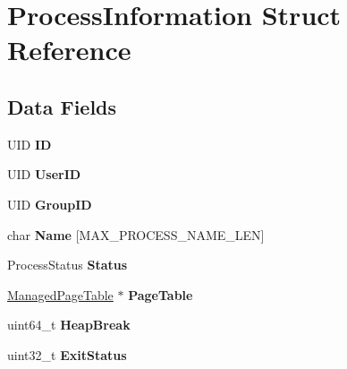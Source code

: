 \hypertarget{structProcessInformation}{}\section{Process\+Information Struct Reference}
\label{structProcessInformation}
\subsection*{Data Fields}
\begin{DoxyCompactItemize}
\item 
U\+ID {\bfseries ID}\hypertarget{structProcessInformation_a511ba3ee8ee6fb0e118805e75c054039}{}\label{structProcessInformation_a511ba3ee8ee6fb0e118805e75c054039}

\item 
U\+ID {\bfseries User\+ID}\hypertarget{structProcessInformation_aac4bbe9db1aabec6224f48a625efacb5}{}\label{structProcessInformation_aac4bbe9db1aabec6224f48a625efacb5}

\item 
U\+ID {\bfseries Group\+ID}\hypertarget{structProcessInformation_a3a34d1bc21f65a73b1a7b6852ba1044b}{}\label{structProcessInformation_a3a34d1bc21f65a73b1a7b6852ba1044b}

\item 
char {\bfseries Name} \mbox{[}M\+A\+X\+\_\+\+P\+R\+O\+C\+E\+S\+S\+\_\+\+N\+A\+M\+E\+\_\+\+L\+EN\mbox{]}\hypertarget{structProcessInformation_a912bea277ead35d49596c85b41741364}{}\label{structProcessInformation_a912bea277ead35d49596c85b41741364}

\item 
Process\+Status {\bfseries Status}\hypertarget{structProcessInformation_a9a59f80490c08ec417e82e6e4bd057f0}{}\label{structProcessInformation_a9a59f80490c08ec417e82e6e4bd057f0}

\item 
\hyperlink{structManagedPageTable}{Managed\+Page\+Table} $\ast$ {\bfseries Page\+Table}\hypertarget{structProcessInformation_abb9a76a4fee7f67a12cbb2440f575115}{}\label{structProcessInformation_abb9a76a4fee7f67a12cbb2440f575115}

\item 
uint64\+\_\+t {\bfseries Heap\+Break}\hypertarget{structProcessInformation_a61cb33f39714fe70956f9cc5a7c9ca9c}{}\label{structProcessInformation_a61cb33f39714fe70956f9cc5a7c9ca9c}

\item 
uint32\+\_\+t {\bfseries Exit\+Status}\hypertarget{structProcessInformation_a79eae1fc9e6a327d6ecc9b35848d5543}{}\label{structProcessInformation_a79eae1fc9e6a327d6ecc9b35848d5543}


\end{DoxyCompactItemize}
